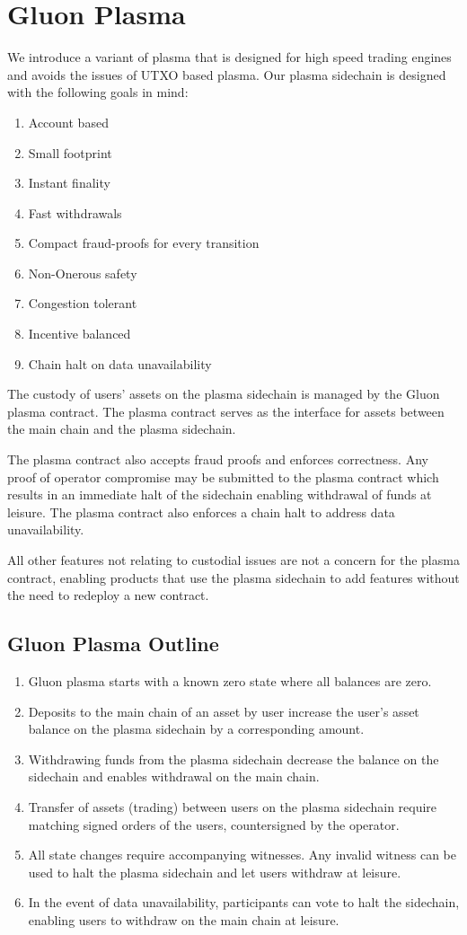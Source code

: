\documentclass[12pt,a4paper]{article}
\begin{document}
\section{Gluon Plasma}
We introduce a variant of plasma that is designed for high speed trading engines and avoids the issues of UTXO based plasma. Our plasma sidechain is designed with the following goals in mind:
\begin{enumerate}
    \item Account based
    \item Small footprint
    \item Instant finality 
    \item Fast withdrawals
    \item Compact fraud-proofs for every transition
    \item Non-Onerous safety 
    \item Congestion tolerant
    \item Incentive balanced
    \item Chain halt on data unavailability
\end{enumerate}
The custody of users’ assets on the plasma sidechain is managed by the Gluon plasma contract. The plasma contract serves as the interface for assets between the main chain and the plasma sidechain. 

The plasma contract also accepts fraud proofs and enforces correctness. Any proof of operator compromise may be submitted to the plasma contract which results in an immediate halt of the sidechain enabling withdrawal of funds at leisure. The plasma contract also enforces a chain halt to address data unavailability.

All other features not relating to custodial issues are not a concern for the plasma contract, enabling products that use the plasma sidechain to add features without the need to redeploy a new contract.
\subsection{Gluon Plasma Outline}
\begin{enumerate}
    \item Gluon plasma starts with a known zero state where all balances are zero.
    \item Deposits to the main chain of an asset by user increase the user’s asset balance on the plasma sidechain by a corresponding amount. 
    \item Withdrawing funds from the plasma sidechain decrease the balance on the sidechain and enables withdrawal on the main chain.
    \item Transfer of assets (trading) between users on the plasma sidechain require matching signed orders of the users, countersigned by the operator. 
    \item All state changes require accompanying witnesses. Any invalid witness can be used to halt the plasma sidechain and let users withdraw at leisure. 
    \item In the event of data unavailability, participants can vote to halt the sidechain, enabling users to withdraw on the main chain at leisure.
\end{enumerate}
\end{document}

